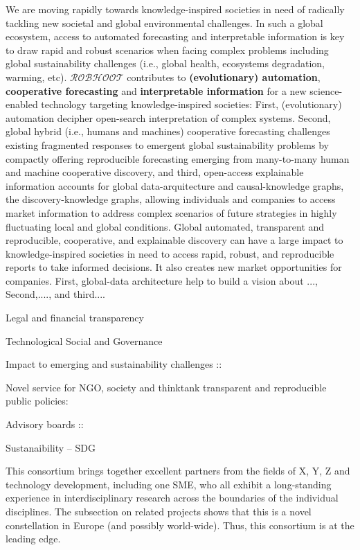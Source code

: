 \documentclass[11pt, a4paper]{article} %
\begin{document}
We are moving rapidly towards knowledge-inspired societies in need of
radically tackling new societal and global environmental
challenges. In such a global ecosystem, access to automated
forecasting and interpretable information is key to draw rapid and
robust scenarios when facing complex problems including global
sustainability challenges (i.e., global health, ecosystems
degradation, warming, etc). {\bf $\mathcal{ROBHOOT}$} contributes to
{\bf (evolutionary) automation}, {\bf cooperative forecasting} and
{\bf interpretable information} for a new science-enabled technology
targeting knowledge-inspired societies: First, (evolutionary)
automation decipher open-search interpretation of complex
systems. Second, global hybrid (i.e., humans and machines) cooperative
forecasting challenges existing fragmented responses to emergent
global sustainability problems by compactly offering reproducible
forecasting emerging from many-to-many human and machine cooperative
discovery, and third, open-access explainable information accounts for
global data-arquitecture and causal-knowledge graphs, the
discovery-knowledge graphs, allowing individuals and companies to
access market information to address complex scenarios of future
strategies in highly fluctuating local and global conditions.
Global automated, transparent and reproducible, cooperative, and
explainable discovery can have a large impact to knowledge-inspired
societies in need to access rapid, robust, and reproducible reports to
take informed decisions. It also creates new market opportunities for
companies. First, global-data architecture help to build a vision
about ..., Second,...., and third....

Legal and financial transparency 

Technological Social and Governance 

Impact to emerging and sustainability challenges ::

Novel service for NGO, society and thinktank transparent and
reproducible public policies:

Advisory boards :: 

Sustanaibility -- SDG 

This consortium brings together excellent partners from the fields of
X, Y, Z and technology development, including one SME, who all exhibit
a long-standing experience in interdisciplinary research across the
boundaries of the individual disciplines. The subsection on related
projects shows that this is a novel constellation in Europe (and
possibly world-wide). Thus, this consortium is at the leading edge.
\end{document}
